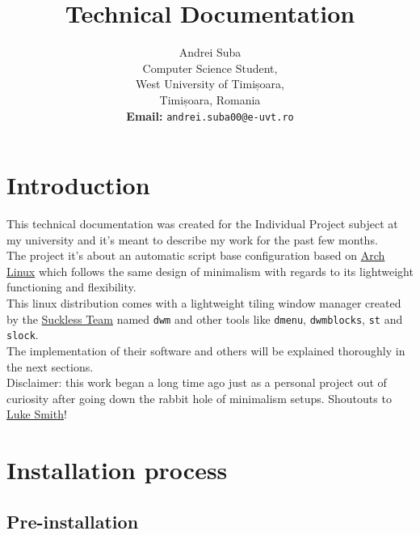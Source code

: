 \documentclass{article}
\title{\textbf{Technical Documentation}}
\author{Andrei Suba\\
    Computer Science Student,\\
	West University of Timișoara,\\
	Timișoara, Romania\\
	\textbf{Email:} \texttt{andrei.suba00@e-uvt.ro}
    }
\date{}
\begin{document}
\maketitle
\thispagestyle{empty}

\clearpage

\tableofcontents

\clearpage

\section{Introduction}

This technical documentation was created for the Individual Project subject at my university and it's meant
to describe my work for the past few months.\\
The project it's about an automatic script base configuration based on \href{https://archlinux.org/}{Arch Linux} which
follows the same design of minimalism with regards to its lightweight functioning and flexibility.\\
This linux distribution comes with a lightweight tiling window manager created by the \href{https://suckless.org/}{Suckless Team} named \texttt{dwm} and other tools like \texttt{dmenu}, \texttt{dwmblocks}, \texttt{st} and \texttt{slock}.\\
The implementation of their software and others will be explained thoroughly in the next sections.\\
\newline
Disclaimer: this work began a long time ago just as a personal project out of curiosity after going down the 
rabbit hole of minimalism setups. Shoutouts to \href{https://lukesmith.xyz/}{Luke Smith}!

\clearpage

\section{Installation process}

\subsection{Pre-installation} \label{preinstallation}
\end{document}
